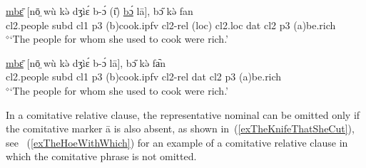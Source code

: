\documentclass[10pt,twoside]{article}
\def\ci#1{{\ipaFont #1}}
\newcommand{\gl}[1]{`#1'}
\def\VSP{\vspace{0pt}}
\newcommand{\cl}[1]{{\sc cl#1}}
\newcommand{\pref}[1]{(\ref{#1})}
\def\elicited{$^\diamond$}
\def\ML#1{#1\symbol{"1DC6}} %
\def\KrnF{f\kern0.8pt{}} %
\def\ih{ɩ}
\begin{document}
\begin{exe}
\ex     \label{DativeWithAndWithoutResPro}
\begin{xlist}

	\ex \label{exThePeopleForWhomWithPro}	
		\gll \uline{mbɛ̄} [nō̤ wù kə̀ dʒìɛ́ b-ɔ́ ({\H\ih}) \uline{bɔ́} lā], bɔ̋ kə̀ \KrnF\ML{a}n	\\
		\cl2.people {\sc subd} \cl1  {\sc p3} ({\sc b})cook.{\sc ipfv} \cl2-{\sc rel} ({\sc loc}) \cl2.{\sc loc}  {\sc dat} \cl2  {\sc p3} ({\sc a})be.rich	\\
		\glt \VSP \elicited \gl{The people for whom she used to cook were rich.}

	\ex \label{exThePeopleForWhomOnlyPP}
		\gll \uline{mbɛ̄} [nō̤ wù kə̀ dʒìɛ́ b-ɔ́ lā], bɔ̋ kə̀ \KrnF{}a᷆n	\\
		\cl2.people {\sc subd} \cl1  {\sc p3} ({\sc b})cook.{\sc ipfv} \cl2-{\sc rel} {\sc dat} \cl2  {\sc p3} ({\sc a})be.rich	\\
		\glt \VSP \elicited \gl{The people for whom she used to cook were rich.}

\end{xlist}
\end{exe}

In a comitative relative clause, the representative nominal can be omitted only if the comitative marker \ci{ā} 
is also absent, as shown in~\pref{exTheKnifeThatSheCut}, see ~\pref{exTheHoeWithWhich} for an example of a comitative relative clause in which the comitative phrase is not omitted.

\end{document}
